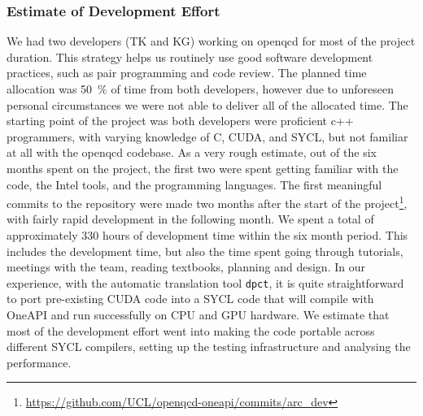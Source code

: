 \documentclass[../main]{subfiles}
\begin{document}

\subsubsection{Estimate of Development Effort}\label{sec:openqcd_personhours}

We had two developers (TK and KG) working on openqcd for most of the project duration.
This strategy helps us routinely use good software development practices, such as pair programming and code review.
The planned time allocation was 50~\% of time from both developers, however due to unforeseen personal circumstances we were not able to deliver all of the allocated time.
The starting point of the project was both developers were proficient c++ programmers, with varying knowledge of C, CUDA, and SYCL, but not familiar at all with the openqcd codebase.
As a very rough estimate, out of the six months spent on the project, the first two were spent getting familiar with the code, the Intel tools, and the programming languages.
The first meaningful commits to the repository were made two months after the start of the project\footnote{\url{https://github.com/UCL/openqcd-oneapi/commits/arc_dev}}, with fairly rapid development in the following month.
We spent a total of approximately 330 hours of development time within the six month period. This includes the development time, but also the time spent going through tutorials, meetings with the team, reading textbooks, planning and design.
In our experience, with the automatic translation tool \texttt{dpct}, it is quite straightforward to port pre-existing CUDA code into a SYCL code that will compile with OneAPI and run successfully on CPU and GPU hardware.
We estimate that most of the development effort went into making the code portable across different SYCL compilers, setting up the testing infrastructure and analysing the performance.
\end{document}
